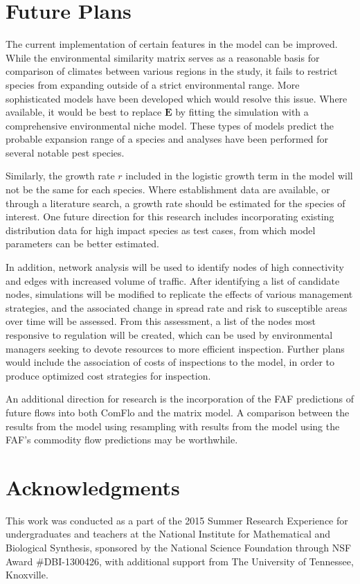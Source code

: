 \documentclass[12pt]{article}
\begin{document}
\section*{Future Plans}

The current implementation of certain features in the model can be improved. While the environmental similarity matrix serves as a reasonable basis for comparison of climates between various regions in the study, it fails to restrict species from expanding outside of a strict environmental range. More sophisticated models have been developed which would resolve this issue. Where available, it would be best to replace $\mathbf{E}$ by fitting the simulation with a comprehensive environmental niche model. These types of models predict the probable expansion range of a species and analyses have been performed for several notable pest species.

Similarly, the growth rate $r$ included in the logistic growth term in the model will not be the same for each species. Where establishment data are available, or through a literature search, a growth rate should be estimated for the species of interest. One future direction for this research includes incorporating existing distribution data for high impact species as test cases, from which model parameters can be better estimated.

In addition, network analysis will be used to identify nodes of high connectivity and edges with increased volume of traffic. After identifying a list of candidate nodes, simulations will be modified to replicate the effects of various management strategies, and the associated change in spread rate and risk to susceptible areas over time will be assessed. From this assessment, a list of the nodes most responsive to regulation will be created, which can be used by environmental managers seeking to devote resources to more efficient inspection.  Further plans would include the association of costs of inspections to the model, in order to produce optimized cost strategies for inspection.

An additional direction for research is the incorporation of the FAF predictions of future flows into both ComFlo and the matrix model. A comparison between the results from the model using resampling with results from the model using the FAF's commodity flow predictions may be worthwhile.


\section*{Acknowledgments}
This work was conducted as a part of the 2015 Summer Research Experience for undergraduates and teachers at the National Institute for Mathematical and Biological Synthesis, sponsored by the National Science Foundation through NSF Award \#DBI-1300426, with additional support from The University of Tennessee, Knoxville.
\end{document}
